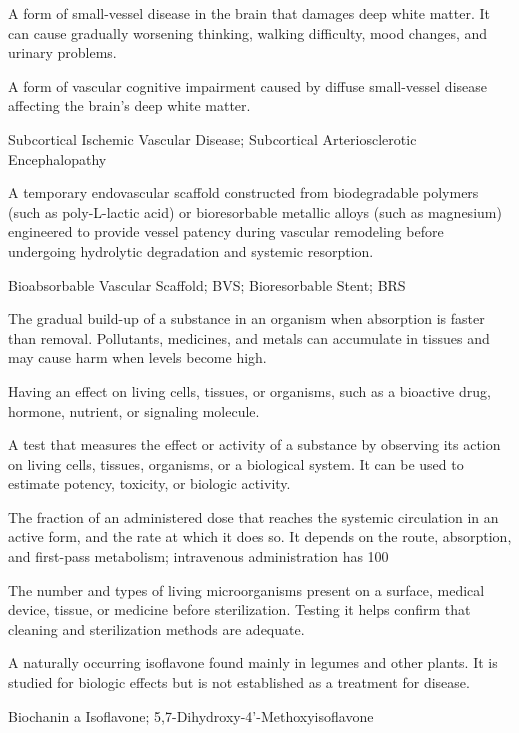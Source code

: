  A form of small-vessel disease in the brain that damages deep white matter. It can cause gradually worsening thinking, walking difficulty, mood changes, and urinary problems.

 A form of vascular cognitive impairment caused by diffuse small-vessel disease affecting the brain's deep white matter.

\synonyms
Subcortical Ischemic Vascular Disease; Subcortical Arteriosclerotic Encephalopathy

 A temporary endovascular scaffold constructed from biodegradable polymers (such as poly-L-lactic acid) or bioresorbable metallic alloys (such as magnesium) engineered to provide vessel patency during vascular remodeling before undergoing hydrolytic degradation and systemic resorption.

\synonyms
Bioabsorbable Vascular Scaffold; BVS; Bioresorbable Stent; BRS

 The gradual build-up of a substance in an organism when absorption is faster than removal. Pollutants, medicines, and metals can accumulate in tissues and may cause harm when levels become high.

 Having an effect on living cells, tissues, or organisms, such as a bioactive drug, hormone, nutrient, or signaling molecule.

 A test that measures the effect or activity of a substance by observing its action on living cells, tissues, organisms, or a biological system. It can be used to estimate potency, toxicity, or biologic activity.

 The fraction of an administered dose that reaches the systemic circulation in an active form, and the rate at which it does so. It depends on the route, absorption, and first-pass metabolism; intravenous administration has 100%

 The number and types of living microorganisms present on a surface, medical device, tissue, or medicine before sterilization. Testing it helps confirm that cleaning and sterilization methods are adequate.

 A naturally occurring isoflavone found mainly in legumes and other plants. It is studied for biologic effects but is not established as a treatment for disease.

\synonyms
Biochanin a Isoflavone; 5,7-Dihydroxy-4'-Methoxyisoflavone

